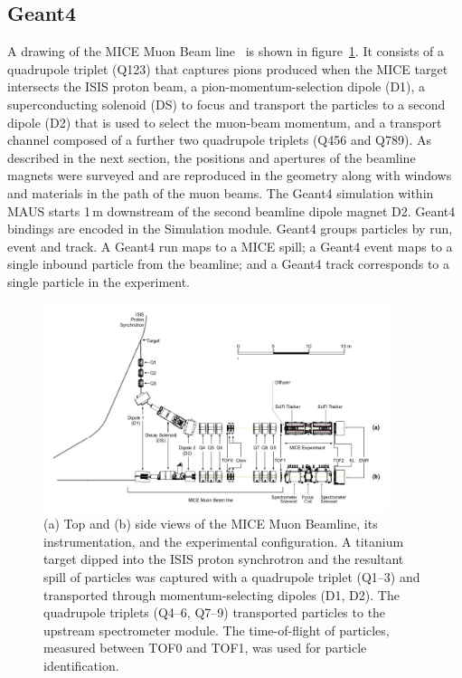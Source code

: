 \documentclass[11pt,a4paper]{article}
\begin{document}
\subsection{Geant4}\label{sec:geant}
A drawing of the MICE Muon Beam line~\cite{BeamlineJINST} is shown in figure~\ref{fig:beamline}. It consists of a quadrupole triplet (Q123) that captures pions produced when the MICE target intersects the ISIS proton beam, a pion-momentum-selection dipole (D1), a superconducting solenoid (DS) to focus and transport the particles to a second dipole (D2) that is used to select the muon-beam momentum, and a transport channel composed of a further two quadrupole triplets (Q456 and Q789). As described in the next section, the positions and apertures of the beamline magnets were surveyed and are reproduced in the geometry along with windows and materials in the path of the muon beams. The Geant4 simulation within MAUS starts 1\,m downstream of the second beamline dipole magnet D2. Geant4 bindings are encoded in the Simulation module. Geant4 groups particles by run, event and track. A Geant4 run maps to a MICE spill; a Geant4 event maps to a single inbound particle from the beamline; and a Geant4 track corresponds to a single particle in the experiment.\\


\begin{figure}[htbp]
  \centering
  \includegraphics[width=0.9\textwidth]{figs/fig-beamline.jpg}
  \caption{(a) Top and (b) side views of the MICE Muon Beamline, its instrumentation, and the experimental configuration. A titanium target dipped into the ISIS proton synchrotron and the resultant spill of particles was captured with a quadrupole triplet (Q1--3) and transported through momentum-selecting dipoles (D1, D2). The quadrupole triplets (Q4--6, Q7--9) transported particles to the upstream spectrometer module. The time-of-flight of particles, measured between TOF0 and TOF1, was used for particle identification.}
  \label{fig:beamline}
\end{figure}
\end{document}
